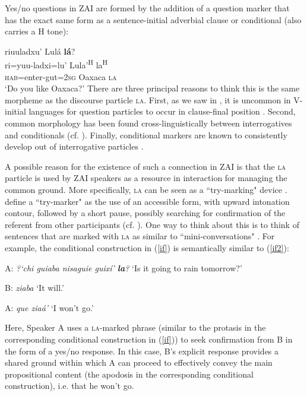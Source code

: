 Yes/no questions in ZAI are formed by the addition of a question marker that has the exact same form as a sentence-initial adverbial clause or conditional (also carries a H tone):

\ea\label{yes/no}
riuuladxu' Lul\'{a} \textbf{l\'{a}}? \\
ri=yuu-ladxi=lu' Lula'\textsuperscript{H} la\textsuperscript{H}  \\
\textsc{hab}=enter-gut=2\textsc{sg} Oaxaca \textsc{la}  \\
\glt `Do you like Oaxaca?' 
\z
There are three principal reasons to think this is the same morpheme as the discourse particle \textsc{la}. First, as we saw in , it is uncommon in V-initial languages for question particles to occur in clause-final position \citep{payne1990}. Second, common morphology has been found cross-linguistically between interrogatives and conditionals (cf. \citealt{haiman1978}). Finally, conditional markers are known to consistently develop out of interrogative particles \citep[296]{konig2007}.

A possible reason for the existence of such a connection in ZAI is that the \textsc{la} particle is used by ZAI speakers as a resource in interaction for managing the common ground. More specifically, \textsc{la} can be seen as a ``try-marking" device \citep{sacks1974}. \citet{sacks1974} define a ``try-marker" as the use of an accessible form, with upward intonation contour, followed by a short pause, possibly searching for confirmation of the referent from other participants (cf. \citealt{pekarek2011}). One way to think about this is to think of sentences that are marked with \textsc{la} as similar to ``mini-conversations" \citep[292]{thompson2007}. For example, the conditional construction in (\ref{if}) is semantically similar to (\ref{if2}):

\ea\label{if2}
A: \textit{{?`}chi guiaba nisaguie guix\'{i}' \textbf{la}?}  
 `Is it going to rain tomorrow?'

B: \textit{ziaba} 
 `It will.'

A: \textit{que zia\'{a}'} 
`I won't go.' 

\z

Here, Speaker A uses a \textsc{la}-marked phrase (similar to the protasis in the corresponding conditional construction in (\ref{if})) to seek confirmation from B in the form of a yes/no response. In this case, B's explicit response provides a shared ground within which A can proceed to effectively convey the main propositional content (the apodosis in the corresponding conditional construction), i.e. that he won't go. 

